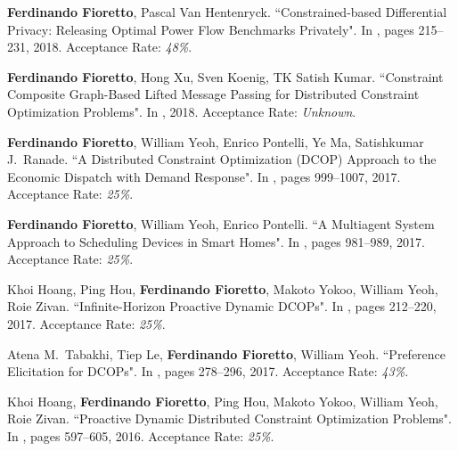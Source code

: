 \item 
	{\bf Ferdinando Fioretto}, Pascal Van Hentenryck. 
	{``Constrained-based Differential Privacy: Releasing Optimal Power Flow Benchmarks Privately"}. 
	In \procCPAIOR, pages 215--231, 2018.
    Acceptance Rate: {\it 48\%}. 

\item
	{\bf Ferdinando Fioretto}, Hong Xu, Sven Koenig, TK Satish Kumar. 
	{``Constraint Composite Graph-Based Lifted Message Passing for Distributed Constraint Optimization Problems"}. 
	In \procISIAM, 2018.  
	Acceptance Rate: {\it Unknown}.

\item 
	{\bf Ferdinando Fioretto}, William Yeoh, Enrico Pontelli, Ye Ma, Satishkumar J.~Ranade. 
	{``A Distributed Constraint Optimization (DCOP) Approach to the Economic Dispatch with Demand Response"}.
	In \procAAMAS, pages  999--1007, 2017.
	Acceptance Rate: {\it 25\%}.%

\item 
	{\bf Ferdinando Fioretto},  William Yeoh, Enrico Pontelli. 
	{``A Multiagent System Approach to Scheduling Devices in Smart Homes"}.
	In \procAAMAS, pages 981--989, 2017. 
	Acceptance Rate: {\it 25\%}.%

\item 
	Khoi Hoang, Ping Hou, {\bf Ferdinando Fioretto}, Makoto Yokoo, William Yeoh, Roie Zivan.
	{``Infinite-Horizon Proactive Dynamic DCOPs"}. 
	In \procAAMAS, pages 212--220, 2017. 
	Acceptance Rate: {\it 25\%}.%

\item 
	Atena M.~Tabakhi, Tiep Le, {\bf Ferdinando Fioretto}, William Yeoh.
	{``Preference Elicitation for DCOPs"}.
	In \procCP, pages 278--296, 2017. 
	Acceptance Rate: {\it 43\%}.%


\item 
	Khoi Hoang, {\bf Ferdinando Fioretto}, Ping Hou, Makoto Yokoo, William Yeoh, Roie Zivan.
	{``Proactive Dynamic Distributed Constraint Optimization Problems"}. 
	In  \procAAMAS, pages 597--605, 2016.
	Acceptance Rate: {\it 25\%}.%

